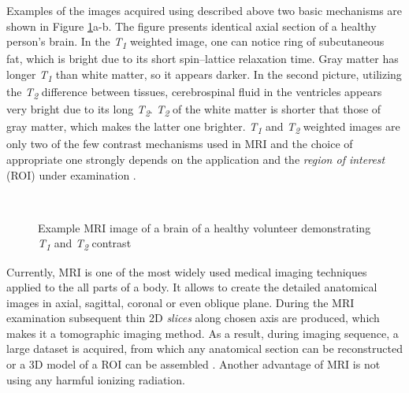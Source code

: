 Examples of the images acquired using described above two basic mechanisms are shown in Figure \ref{fig:t1t2}a-b. 
The figure presents identical axial section of a healthy person's brain. In the \textit{T\textsubscript{1}} weighted  image, one can notice ring of subcutaneous fat, which is bright due to its short spin–lattice relaxation time. Gray matter has longer \textit{T\textsubscript{1}} than white matter, so it appears darker. In the second picture, utilizing the \textit{T\textsubscript{2}} difference between tissues, cerebrospinal fluid in the ventricles appears very bright due to its long  \textit{T\textsubscript{2}}. \textit{T\textsubscript{2}} of the white matter is shorter that those of gray matter, which makes the latter one brighter. \textit{T\textsubscript{1}} and \textit{T\textsubscript{2}} weighted images are only two of the few contrast mechanisms used in  MRI and the choice of appropriate one strongly depends on the application and the \textit{region of interest} (ROI) under examination \cite{biomedical_hanbook_imaging}.

 
\begin{figure}

\captionsetup[subfloat]{captionskip=0.5cm}
	\centering
	\hspace{1.5cm}
	\\	
\vspace{0.5cm}
\caption[Comparison of \textit{T\textsubscript{1}}- and \textit{T\textsubscript{2}}-weighted images]{Example MRI image of a brain of a healthy volunteer demonstrating \textit{T\textsubscript{1}} and \textit{T\textsubscript{2}} contrast \cite{t1t2brain}}
\label{fig:t1t2}
\end{figure}

Currently, MRI is one of the most widely used medical imaging techniques applied to the all parts of a body. It allows to create the detailed anatomical images in axial, sagittal, coronal or even oblique plane. During the MRI examination subsequent thin 2D \textit{slices} along chosen axis are produced, which makes it a tomographic imaging method. As a result, during imaging sequence, a large dataset is acquired, from which any anatomical section can be reconstructed or a 3D model of a ROI can be assembled \cite {bushong2014magnetic}. Another advantage of MRI is not using any harmful ionizing radiation.

